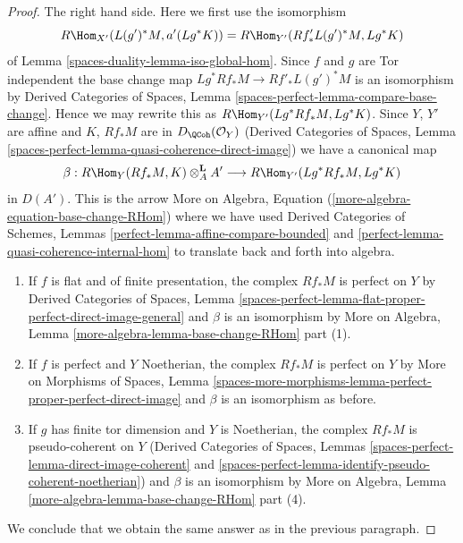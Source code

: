 \begin{proof}
\medskip\noindent
The right hand side. Here we first use the isomorphism
$$
R\Hom_{X'}(L(g')^*M, a'(Lg^*K)) = R\Hom_{Y'}(Rf'_*L(g')^*M, Lg^*K)
$$
of Lemma \ref{spaces-duality-lemma-iso-global-hom}. Since $f$ and $g$ are
Tor independent the base change
map $Lg^*Rf_*M \to Rf'_*L(g')^*M$ is an isomorphism by
Derived Categories of Spaces, Lemma
\ref{spaces-perfect-lemma-compare-base-change}.
Hence we may rewrite this as $R\Hom_{Y'}(Lg^*Rf_*M, Lg^*K)$.
Since $Y$, $Y'$ are affine and $K$, $Rf_*M$ are in $D_\QCoh(\mathcal{O}_Y)$
(Derived Categories of Spaces, Lemma
\ref{spaces-perfect-lemma-quasi-coherence-direct-image})
we have a canonical map
$$
\beta :
R\Hom_Y(Rf_*M, K) \otimes^\mathbf{L}_A A'
\longrightarrow
R\Hom_{Y'}(Lg^*Rf_*M, Lg^*K)
$$
in $D(A')$. This is the arrow
More on Algebra, Equation (\ref{more-algebra-equation-base-change-RHom})
where we have used Derived Categories of Schemes, Lemmas
\ref{perfect-lemma-affine-compare-bounded} and
\ref{perfect-lemma-quasi-coherence-internal-hom}
to translate back and forth into algebra.
\begin{enumerate}
\item If $f$ is flat and of finite presentation, the complex $Rf_*M$
is perfect on $Y$ by Derived Categories of Spaces, Lemma
\ref{spaces-perfect-lemma-flat-proper-perfect-direct-image-general}
and $\beta$ is an isomorphism by
More on Algebra, Lemma \ref{more-algebra-lemma-base-change-RHom} part (1).
\item If $f$ is perfect and $Y$ Noetherian, the complex $Rf_*M$
is perfect on $Y$ by More on Morphisms of Spaces, Lemma
\ref{spaces-more-morphisms-lemma-perfect-proper-perfect-direct-image}
and $\beta$ is an isomorphism as before.
\item If $g$ has finite tor dimension and $Y$ is Noetherian,
the complex $Rf_*M$ is pseudo-coherent on $Y$
(Derived Categories of Spaces, Lemmas
\ref{spaces-perfect-lemma-direct-image-coherent} and
\ref{spaces-perfect-lemma-identify-pseudo-coherent-noetherian})
and $\beta$ is an isomorphism by
More on Algebra, Lemma \ref{more-algebra-lemma-base-change-RHom} part (4).
\end{enumerate}
We conclude that we obtain the same answer as in the previous paragraph.


\end{proof}
